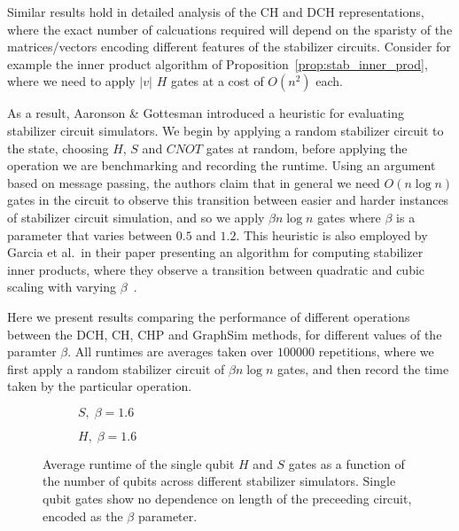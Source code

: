 Similar results hold in detailed analysis of the CH and DCH representations, where the exact number of calcuations required will depend on the sparisty of the matrices/vectors encoding different features of the stabilizer circuits. Consider for example the inner product algorithm of Proposition~\ref{prop:stab_inner_prod}, where we need to apply $\vert v\vert$ $H$ gates at a cost of $O(n^{2})$ each.\par
As a result, Aaronson \& Gottesman introduced a heuristic for evaluating stabilizer circuit simulators. We begin by applying a random stabilizer circuit to the state, choosing $H$, $S$ and $CNOT$ gates at random, before applying the operation we are benchmarking and recording the runtime. Using an argument based on message passing, the authors claim that in general we need $O(n\log{n})$ gates in the circuit to observe this transition between easier and harder instances of stabilizer circuit simulation, and so we apply $\beta n\log{n}$ gates where $\beta$ is a parameter that varies between $0.5$ and $1.2$. This heuristic is also employed by Garcia et al.\ in their paper presenting an algorithm for computing stabilizer inner products, where they observe a transition between quadratic and cubic scaling with varying $\beta$~\cite{Garcia2012}.\par
Here we present results comparing the performance of different operations between the DCH, CH, CHP and GraphSim methods, for different values of the paramter $\beta$. All runtimes are averages taken over $100000$ repetitions, where we first apply a random stabilizer circuit of $\beta n\log{n}$ gates, and then record the time taken by the particular operation.\par
\begin{figure}[p]
\centering
\begin{subfigure}[t]{0.48\textwidth}
    \centering
    \caption{$S,\;\beta=1.6$}
    \begin{scaletikzpicturetowidth}{\textwidth}
        
    \end{scaletikzpicturetowidth}
\end{subfigure}
\begin{subfigure}[t]{0.48\textwidth}
    \centering
    \caption{$H,\;\beta=1.6$}
    \begin{scaletikzpicturetowidth}{\textwidth}
        
    \end{scaletikzpicturetowidth}
\end{subfigure}
\caption{Average runtime of the single qubit $H$ and $S$ gates as a function of the number of qubits across different stabilizer simulators. Single qubit gates show no dependence on length of the preceeding circuit, encoded as the $\beta$ parameter.}
\label{fig:single_qubit_clifford_timings}
\end{figure}
